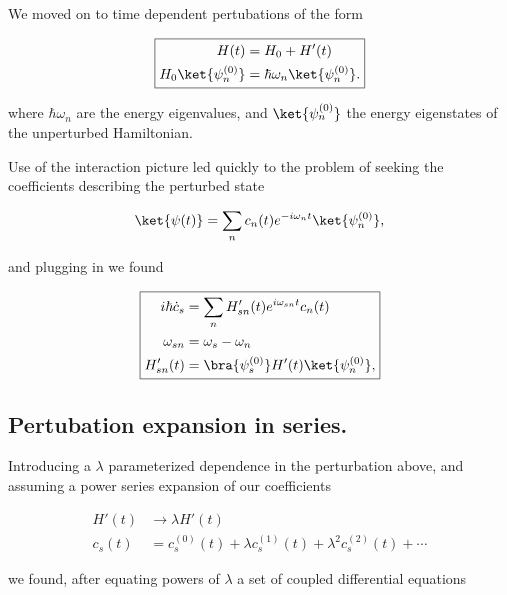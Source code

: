 We moved on to time dependent pertubations of the form

\begin{equation}\label{eqn:qmTwoReview:n}
\boxed{
\begin{aligned}
H(t) &= H_0 + H'(t) \\
H_0 \ket{\psi_n^{(0)} } &= \hbar \omega_n \ket{\psi_n^{(0)} }.
\end{aligned}
}
\end{equation}

where $\hbar \omega_n$ are the energy eigenvalues, and $\ket{\psi_n^{(0)} }$ the energy eigenstates of the unperturbed Hamiltonian.

Use of the interaction picture led quickly to the problem of seeking the coefficients describing the perturbed state

\begin{equation}\label{eqn:qmTwoReview:n}
\ket{\psi(t)} = \sum_n c_n(t) e^{-i \omega_n t} \ket{\psi_n^{(0)} },
\end{equation}

and plugging in we found

\begin{equation}\label{eqn:qmTwoReview:n}
\boxed{
\begin{aligned}
i \hbar \dot{c}_s &= \sum_n H_{sn}'(t) e^{i \omega_{sn} t} c_n(t) \\
\omega_{sn} &= \omega_s - \omega_n \\
H_{sn}'(t) &= \bra{\psi_s^{(0)}} H'(t) \ket{\psi_n^{(0)} },
\end{aligned}
}
\end{equation}

\subsection{Pertubation expansion in series.}

Introducing a $\lambda$ parameterized dependence in the perturbation above, and assuming a power series expansion of our coefficients

\begin{equation}\label{eqn:qmTwoReview:n}
\boxed{
\begin{aligned}
H'(t) &\rightarrow \lambda H'(t) \\
c_s(t) &= c_s^{(0)}(t) + \lambda c_s^{(1)}(t) + \lambda^2 c_s^{(2)}(t) + \cdots
\end{aligned}
}
\end{equation}

we found, after equating powers of $\lambda$ a set of coupled differential equations

